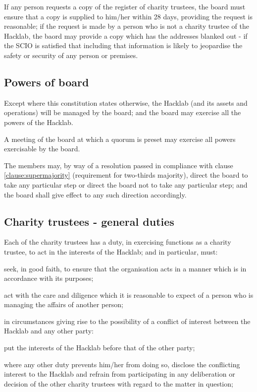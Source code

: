 \documentclass{article}
\begin{document}
\clause If any person requests a copy of the register of charity
trustees, the board must ensure that a copy is supplied to him/her
within 28 days, providing the request is reasonable; if the request is
made by a person who is not a charity trustee of the Hacklab, the
baord may provide a copy which has the addresses blanked out - if the
SCIO is satisfied that including that information is likely to
jeopardise the safety or security of any person or premises.

\subsection{Powers of board}

\clause Except where this constitution states otherwise, the
Hacklab (and its assets and operations) will be managed by the
board; and the board may exercise all the powers of the Hacklab.

\clause A meeting of the board at which a quorum is preset may
exercise all powers exercisable by the board.

\clause The members may, by way of a resolution passed in compliance
with clause \ref{clause:supermajority} (requirement for two-thirds
majority), direct the board to take any particular step or direct the
board not to take any particular step; and the board shall give effect
to any such direction accordingly.

\subsection{Charity trustees - general duties}

\clause\label{clause:trusteeduties}Each of the charity trustees has a duty, in exercising
functions as a charity trustee, to act in the interests of the
Hacklab; and in particular, must:

\subclause seek, in good faith, to ensure that the organisation acts
in a manner which is in accordance with its purposes;

\subclause act with the care and diligence which it is reasonable to
expect of a person who is managing the affairs of another person;

\subclause in circumstances giving rise to the possibility of a
conflict of interest between the Hacklab and any other party:

\subclause put the interests of the Hacklab before that of the
other party;

\subsubclause where any other duty prevents him/her from doing so,
disclose the conflicting interest to the Hacklab and refrain from
participating in any deliberation or decision of the other charity
trustees with regard to the matter in question;
\end{document}
